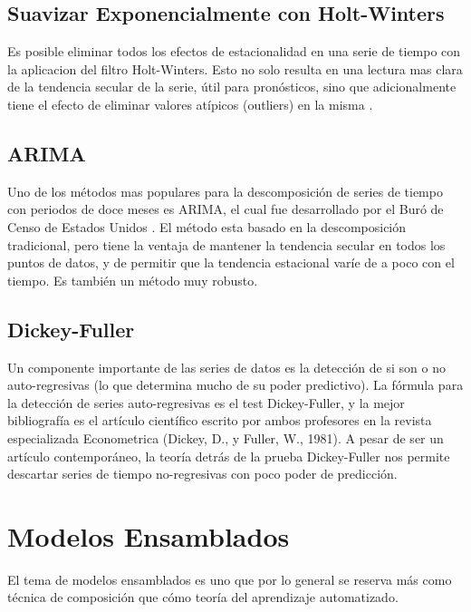 \documentclass[letterpaper, spanish, 11pt]{report}
\begin{document}
\subsection{Suavizar Exponencialmente con Holt-Winters}
Es posible eliminar todos los efectos de estacionalidad en una serie de tiempo con la aplicacion del filtro Holt-Winters. Esto no solo resulta en una lectura mas clara de la tendencia secular de la serie, útil para pronósticos, sino que adicionalmente tiene el efecto de eliminar valores atípicos (outliers) en la misma \cite{daroczi}.

\subsection{ARIMA}
Uno de los métodos mas populares para la descomposición de series de tiempo con periodos de doce meses es ARIMA, el cual fue desarrollado por el Buró de Censo de Estados Unidos \cite{hyndman}. El método esta basado en la descomposición tradicional, pero tiene la ventaja de mantener la tendencia secular en todos los puntos de datos, y de permitir que la tendencia estacional varíe de a poco con el tiempo. Es también un método muy robusto.

\subsection{Dickey-Fuller} 
Un componente importante de las series de datos es la detección de si son o no auto-regresivas (lo que determina mucho de su poder predictivo). La fórmula para la detección de series auto-regresivas es el test Dickey-Fuller, y la mejor bibliografía es el artículo científico escrito por ambos profesores en la revista especializada Econometrica (Dickey, D., y Fuller, W., 1981). A pesar de ser un artículo contemporáneo, la teoría detrás de la prueba Dickey-Fuller nos permite descartar series de tiempo no-regresivas con poco poder de predicción. 

\section{Modelos Ensamblados}
El tema de modelos ensamblados es uno que por lo general se reserva más como técnica de composición que cómo teoría del aprendizaje automatizado. 
\end{document}
